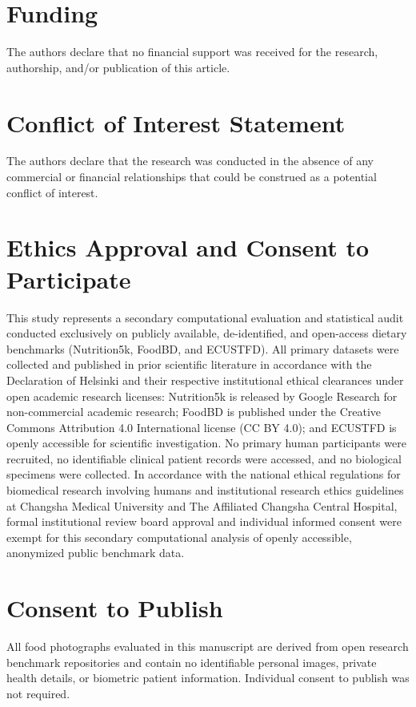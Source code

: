 \documentclass[utf8]{FrontiersinVancouver}
\begin{document}
\section*{Funding}
The authors declare that no financial support was received for the research, authorship, and/or publication of this article.

\section*{Conflict of Interest Statement}
The authors declare that the research was conducted in the absence of any commercial or financial relationships that could be construed as a potential conflict of interest.

\section*{Ethics Approval and Consent to Participate}
This study represents a secondary computational evaluation and statistical audit conducted exclusively on publicly available, de-identified, and open-access dietary benchmarks (Nutrition5k, FoodBD, and ECUSTFD). All primary datasets were collected and published in prior scientific literature in accordance with the Declaration of Helsinki and their respective institutional ethical clearances under open academic research licenses: Nutrition5k is released by Google Research for non-commercial academic research; FoodBD is published under the Creative Commons Attribution 4.0 International license (CC BY 4.0); and ECUSTFD is openly accessible for scientific investigation. No primary human participants were recruited, no identifiable clinical patient records were accessed, and no biological specimens were collected. In accordance with the national ethical regulations for biomedical research involving humans and institutional research ethics guidelines at Changsha Medical University and The Affiliated Changsha Central Hospital, formal institutional review board approval and individual informed consent were exempt for this secondary computational analysis of openly accessible, anonymized public benchmark data.

\section*{Consent to Publish}
All food photographs evaluated in this manuscript are derived from open research benchmark repositories and contain no identifiable personal images, private health details, or biometric patient information. Individual consent to publish was not required.
\end{document}

